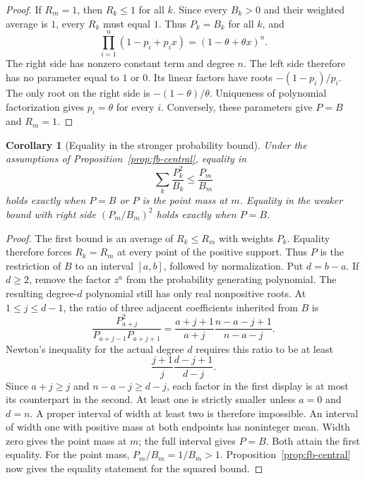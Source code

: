 \documentclass[11pt,a4paper]{article}
\newtheorem{corollary}[theorem]{Corollary}
\theoremstyle{definition}
\theoremstyle{remark}
\begin{document}
\begin{proof}
If $R_m=1$, then $R_k\leq1$ for all $k$.
Since every $B_k>0$ and their weighted average is $1$, every
$R_k$ must equal $1$. Thus $P_k=B_k$ for all $k$, and
\begin{equation}\label{eq:fb-factor-equality}
 \prod_{i=1}^n(1-p_i+p_ix)=(1-\theta+\theta x)^n.
\end{equation}
The right side has nonzero constant term and degree $n$.
The left side therefore has no parameter equal to $1$ or $0$.
Its linear factors have roots $-(1-p_i)/p_i$.
The only root on the right side is $-(1-\theta)/\theta$.
Uniqueness of polynomial factorization gives
$p_i=\theta$ for every $i$.
Conversely, these parameters give $P=B$ and $R_m=1$.
\end{proof}

\begin{corollary}[Equality in the stronger probability bound]\label{cor:fb-norm-equality}
Under the assumptions of Proposition~\ref{prop:fb-central}, equality in
\[
 \sum_k\frac{P_k^2}{B_k}\le\frac{P_m}{B_m}
\]
holds exactly when $P=B$ or $P$ is the point mass at $m$.
Equality in the weaker bound with right side $(P_m/B_m)^2$ holds exactly when $P=B$.
\end{corollary}

\begin{proof}
The first bound is an average of $R_k\le R_m$ with weights $P_k$.
Equality therefore forces $R_k=R_m$ at every point of the positive support.
Thus $P$ is the restriction of $B$ to an interval $[a,b]$, followed by normalization.
Put $d=b-a$.
If $d\ge2$, remove the factor $z^a$ from the probability generating polynomial.
The resulting degree-$d$ polynomial still has only real nonpositive roots.
At $1\le j\le d-1$, the ratio of three adjacent coefficients inherited from $B$ is
\[
 \frac{P_{a+j}^2}{P_{a+j-1}P_{a+j+1}}
 =\frac{a+j+1}{a+j}\frac{n-a-j+1}{n-a-j}.
\]
Newton's inequality for the actual degree $d$ requires this ratio to be at least
\[
 \frac{j+1}{j}\frac{d-j+1}{d-j}.
\]
Since $a+j\ge j$ and $n-a-j\ge d-j$, each factor in the first display is at most its counterpart in the second.
At least one is strictly smaller unless $a=0$ and $d=n$.
A proper interval of width at least two is therefore impossible.
An interval of width one with positive mass at both endpoints has noninteger mean.
Width zero gives the point mass at $m$; the full interval gives $P=B$.
Both attain the first equality.
For the point mass, $P_m/B_m=1/B_m>1$.
Proposition~\ref{prop:fb-central} now gives the equality statement for the squared bound.
\end{proof}
\end{document}
